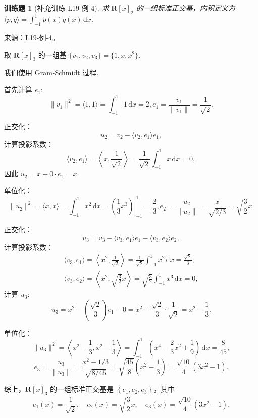 \documentclass[UTF8,12pt,a4paper,fontset=fandol]{ctexart}
\newtheorem{exercise}{训练题}[section]
\begin{document}
\begin{exercise}[补充训练 L19-例-4]\label{prob:L19-例-4}
求 $\mathbf{R}[x]_2$ 的一组标准正交基，内积定义为 $\langle p, q \rangle = \displaystyle\int_{-1}^1 p(x)q(x)\,\mathrm{d}x$.
\end{exercise}
\noindent 来源：\href{https://github.com/yhwu-is/Linear-Algebra-Left-Undone/blob/new/%E8%AE%B2%E4%B9%89/%E4%B8%93%E9%A2%98/19%20%E5%86%85%E7%A7%AF%E7%A9%BA%E9%97%B4.tex}{L19-例-4}。
\begin{solve}
取 $\mathbf{R}[x]_3$ 的一组基 $\{v_1, v_2, v_3\} = \{1, x, x^2\}$.

    我们使用 Gram-Schmidt 过程.

    首先计算 $e_1$:
    \[ \lVert v_1 \rVert^2 = \langle 1, 1 \rangle = \int_{-1}^1 1 \,\mathrm{d}x = 2, e_1 = \frac{v_1}{\lVert v_1 \rVert} = \frac{1}{\sqrt{2}}. \]

    正交化：
    \[ u_2 = v_2 - \langle v_2, e_1 \rangle e_1, \]
    计算投影系数：
    \[ \langle v_2, e_1 \rangle = \left\langle x, \frac{1}{\sqrt{2}} \right\rangle = \frac{1}{\sqrt{2}} \int_{-1}^1 x \,\mathrm{d}x = 0, \]
    因此 $u_2 = x - 0 \cdot e_1 = x$.

    单位化：
    \[ \lVert u_2 \rVert^2 = \langle x, x \rangle = \int_{-1}^1 x^2 \,\mathrm{d}x = \left.\left(\frac{1}{3}x^3\right)\right\vert_{-1}^1= \frac{2}{3}, e_2 = \frac{u_2}{\lVert u_2 \rVert} = \frac{x}{\sqrt{2/3}} = \sqrt{\frac{3}{2}} x. \]

    正交化：
    \[ u_3 = v_3 - \langle v_3, e_1 \rangle e_1 - \langle v_3, e_2 \rangle e_2, \]
    计算投影系数：
    \begin{gather*}
        \langle v_3, e_1 \rangle = \left\langle x^2, \frac{1}{\sqrt{2}} \right\rangle = \frac{1}{\sqrt{2}} \int_{-1}^1 x^2 \,\mathrm{d}x = \frac{\sqrt{2}}{3}, \\
        \langle v_3, e_2 \rangle = \left\langle x^2, \sqrt{\frac{3}{2}} x \right\rangle = \sqrt{\frac{3}{2}} \int_{-1}^1 x^3 \,\mathrm{d}x = 0,
    \end{gather*}
    计算 $u_3$:
    \[ u_3 = x^2 - \left(\frac{\sqrt{2}}{3}\right) e_1 - 0 = x^2 - \frac{\sqrt{2}}{3} \cdot \frac{1}{\sqrt{2}} = x^2 - \frac{1}{3}. \]

    单位化：
    \[ \lVert u_3 \rVert^2 = \left\langle x^2 - \frac{1}{3}, x^2 - \frac{1}{3} \right\rangle = \int_{-1}^1 \left(x^4 - \frac{2}{3}x^2 + \frac{1}{9}\right) \,\mathrm{d}x = \frac{8}{45}, \]
    \[ e_3 = \frac{u_3}{\lVert u_3 \rVert} = \frac{x^2 - 1/3}{\sqrt{8/45}} = \sqrt{\frac{45}{8}} \left(x^2 - \frac{1}{3}\right) = \frac{\sqrt{10}}{4} (3x^2 - 1). \]

    综上，$\mathbf{R}[x]_3$ 的一组标准正交基是 $\left\{e_1, e_2, e_3\right\}$，其中
    \[ e_1(x) = \frac{1}{\sqrt{2}}, \quad e_2(x) = \sqrt{\frac{3}{2}} x, \quad e_3(x) = \frac{\sqrt{10}}{4} (3x^2 - 1). \]
\end{solve}
\end{document}
